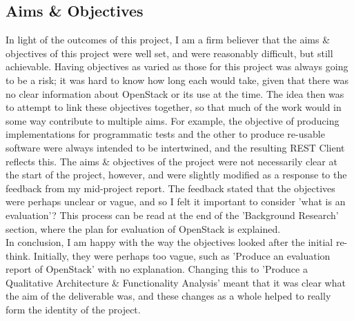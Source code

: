 \subsection{Aims \& Objectives}
In light of the outcomes of this project, I am a firm believer that the aims \& objectives of this project were well set, and were reasonably difficult, but still achievable. Having objectives as varied as those for this project was always going to be a risk; it was hard to know how long each would take, given that there was no clear information about OpenStack or its use at the time. The idea then was to attempt to link these objectives together, so that much of the work would in some way contribute to multiple aims. For example, the objective of producing implementations for programmatic tests and the other to produce re-usable software were always intended to be intertwined, and the resulting REST Client reflects this. The aims \& objectives of the project were not necessarily clear at the start of the project, however, and were slightly modified as a response to the feedback from my mid-project report. The feedback stated that the objectives were perhaps unclear or vague, and so I felt it important to consider 'what is an evaluation'? This process can be read at the end of the 'Background Research' section, where the plan for evaluation of OpenStack is explained. \\
In conclusion, I am happy with the way the objectives looked after the initial re-think. Initially, they were perhaps too vague, such as 'Produce an evaluation report of OpenStack' with no explanation. Changing this to 'Produce a Qualitative Architecture \& Functionality Analysis' meant that it was clear what the aim of the deliverable was, and these changes as a whole helped to really form the identity of the project. 

